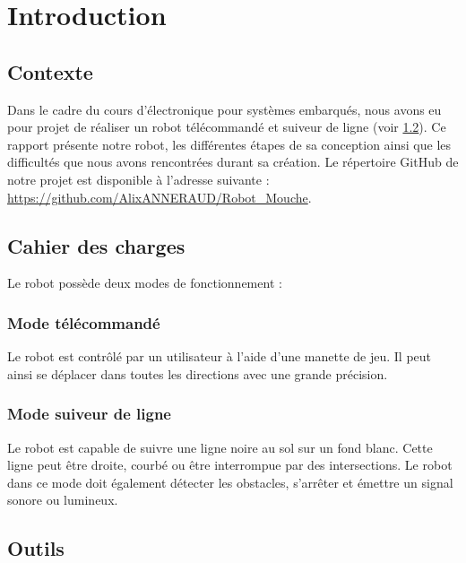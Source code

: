 \chapter{Introduction}

\section{Contexte}

Dans le cadre du cours d'électronique pour systèmes embarqués,
nous avons eu pour projet de réaliser un robot télécommandé et suiveur de ligne (voir \ref{cahier_des_charges}).
Ce rapport présente notre robot, les différentes étapes de sa conception ainsi que les difficultés que nous avons rencontrées durant sa création.
Le répertoire GitHub de notre projet est disponible à l'adresse suivante : \url{https://github.com/AlixANNERAUD/Robot_Mouche}.

\section{Cahier des charges} \label{cahier_des_charges}

Le robot possède deux modes de fonctionnement :

\subsection{Mode télécommandé}

Le robot est contrôlé par un utilisateur à l'aide d'une manette de jeu.
Il peut ainsi se déplacer dans toutes les directions avec une grande précision.

\subsection{Mode suiveur de ligne}

Le robot est capable de suivre une ligne noire au sol sur un fond blanc.
Cette ligne peut être droite, courbé ou être interrompue par des intersections.
Le robot dans ce mode doit également détecter les obstacles, s'arrêter et émettre un signal sonore ou lumineux.

\section{Outils}

